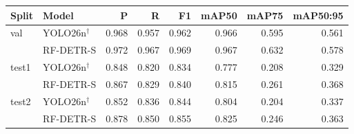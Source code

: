 \begin{tabular}{llrrrrrr}
\toprule
Split & Model & P & R & F1 & mAP50 & mAP75 & mAP50:95 \\
\midrule
val & YOLO26n$^\dagger$ & 0.968 & 0.957 & 0.962 & 0.966 & 0.595 & 0.561 \\
 & RF-DETR-S & 0.972 & 0.967 & 0.969 & 0.967 & 0.632 & 0.578 \\
\midrule
test1 & YOLO26n$^\dagger$ & 0.848 & 0.820 & 0.834 & 0.777 & 0.208 & 0.329 \\
 & RF-DETR-S & 0.867 & 0.829 & 0.840 & 0.815 & 0.261 & 0.368 \\
\midrule
test2 & YOLO26n$^\dagger$ & 0.852 & 0.836 & 0.844 & 0.804 & 0.204 & 0.337 \\
 & RF-DETR-S & 0.878 & 0.850 & 0.855 & 0.825 & 0.246 & 0.363 \\
\bottomrule
\end{tabular}
